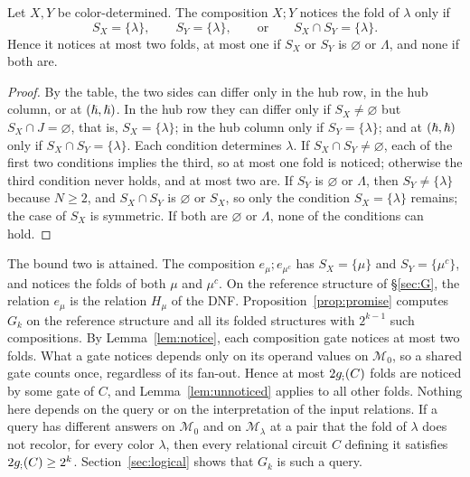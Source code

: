 \begin{lemma}\label{lem:local}\label{lem:notice}
Let $X,Y$ be color-determined. The composition $X;Y$
notices the fold of $\lambda$ only if
\[
 S_X=\{\lambda\},\qquad S_Y=\{\lambda\},\qquad\text{or}\qquad
 S_X\cap S_Y=\{\lambda\}.
\]
Hence it notices at most two folds, at most one if $S_X$ or $S_Y$ is
$\varnothing$ or $\Lambda$, and none if both are.
\end{lemma}
\begin{proof}
By the table, the two sides can differ only in the hub row, in the hub
column, or at $(\hslash,\hslash)$. In the hub row they can differ only if
$S_X\ne\varnothing$ but $S_X\cap J=\varnothing$, that is,
$S_X=\{\lambda\}$; in the hub column only if $S_Y=\{\lambda\}$; and at
$(\hslash,\hslash)$ only if $S_X\cap S_Y=\{\lambda\}$. Each condition
determines $\lambda$. If $S_X\cap S_Y\ne\varnothing$, each of the first
two conditions implies the third, so at most one fold is noticed;
otherwise the third condition never holds, and at most two are. If $S_Y$
is $\varnothing$ or $\Lambda$, then $S_Y\ne\{\lambda\}$ because $N\ge2$,
and $S_X\cap S_Y$ is $\varnothing$ or $S_X$, so only the condition
$S_X=\{\lambda\}$ remains; the case of $S_X$ is symmetric. If both are
$\varnothing$ or $\Lambda$, none of the conditions can hold.
\end{proof}
The bound two is attained. The composition $e_\mu;e_{\mu^c}$ has
$S_X=\{\mu\}$ and $S_Y=\{\mu^c\}$, and notices the folds of both $\mu$
and $\mu^c$. On the reference structure of \S\ref{sec:G}, the relation
$e_\mu$ is the relation $H_\mu$ of the DNF.
Proposition~\ref{prop:promise} computes $G_k$ on the reference structure
and all its folded structures with $2^{k-1}$ such compositions.
By Lemma~\ref{lem:notice}, each composition gate notices at most two
folds. What a gate notices depends only on its operand values on
$\mathcal M_0$, so a shared gate counts once, regardless of its fan-out.
Hence at most $2g_{;}(C)$ folds are noticed by some gate of $C$, and
Lemma~\ref{lem:unnoticed} applies to all other folds. Nothing here
depends on the query or on the interpretation of the input relations. If
a query has different answers on $\mathcal M_0$ and on
$\mathcal M_\lambda$ at a pair that the fold of $\lambda$ does not
recolor, for every color $\lambda$, then every relational circuit $C$
defining it satisfies $2g_{;}(C)\ge2^k$. Section~\ref{sec:logical} shows
that $G_k$ is such a query.

